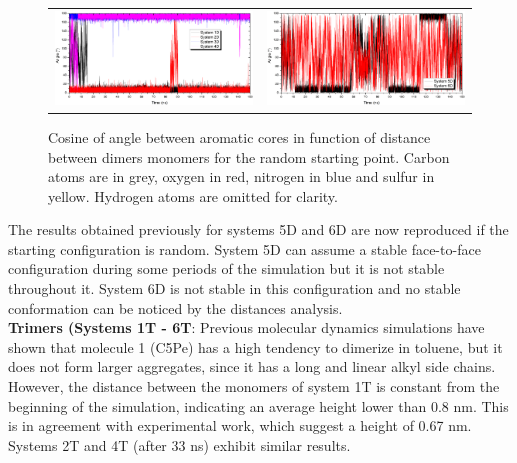 \begin{figure}[htb]
	\begin{tabular}{cc}
		\includegraphics[width=0.45\columnwidth]{image/angle_1-4}&
		\includegraphics[width=0.45\columnwidth]{image/angle_5-6}\\
	\end{tabular}
	\caption{Cosine of angle between aromatic cores in function of distance between dimers monomers for the random starting point. Carbon atoms are in grey, oxygen in red, nitrogen in blue and sulfur in yellow. Hydrogen atoms are omitted for clarity.}
	\label{pap:fig10}
\end{figure}	

The results obtained previously for systems 5D and 6D are now reproduced if the starting configuration is random. System 5D can assume a stable face-to-face configuration during some periods of the simulation but it is not stable throughout it. System 6D is not stable in this configuration and no stable conformation can be noticed by the distances analysis.\\

\textbf{Trimers (Systems 1T - 6T}: Previous molecular dynamics simulations have shown that molecule 1 (C5Pe) has a high tendency to dimerize in toluene, but it does not form larger aggregates, since it has a long and linear alkyl side chains.\cite{teklebrhan2012probing} However, the distance between the monomers of system 1T is constant from the beginning of the simulation, indicating an average height lower than 0.8 nm.  This is in agreement with experimental work,\cite{eyssautier2011insight} which suggest a height of 0.67 nm. Systems 2T and 4T (after 33 ns) exhibit similar results.\\ 


